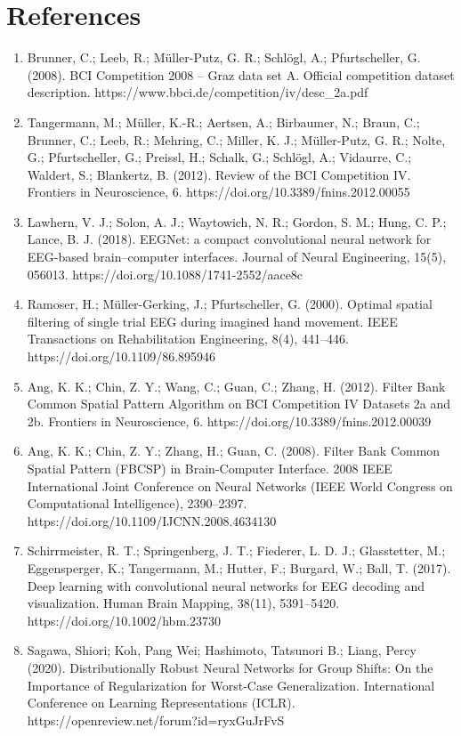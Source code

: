 \documentclass[11pt]{article}
\begin{document}
\section*{References}
\begin{enumerate}
\item Brunner, C.; Leeb, R.; Müller-Putz, G. R.; Schlögl, A.; Pfurtscheller, G. (2008). BCI Competition 2008 -- Graz data set A. Official competition dataset description. https://www.bbci.de/competition/iv/desc\_2a.pdf
\item Tangermann, M.; Müller, K.-R.; Aertsen, A.; Birbaumer, N.; Braun, C.; Brunner, C.; Leeb, R.; Mehring, C.; Miller, K. J.; Müller-Putz, G. R.; Nolte, G.; Pfurtscheller, G.; Preissl, H.; Schalk, G.; Schlögl, A.; Vidaurre, C.; Waldert, S.; Blankertz, B. (2012). Review of the BCI Competition IV. Frontiers in Neuroscience, 6. https://doi.org/10.3389/fnins.2012.00055
\item Lawhern, V. J.; Solon, A. J.; Waytowich, N. R.; Gordon, S. M.; Hung, C. P.; Lance, B. J. (2018). EEGNet: a compact convolutional neural network for EEG-based brain--computer interfaces. Journal of Neural Engineering, 15(5), 056013. https://doi.org/10.1088/1741-2552/aace8c
\item Ramoser, H.; Müller-Gerking, J.; Pfurtscheller, G. (2000). Optimal spatial filtering of single trial EEG during imagined hand movement. IEEE Transactions on Rehabilitation Engineering, 8(4), 441--446. https://doi.org/10.1109/86.895946
\item Ang, K. K.; Chin, Z. Y.; Wang, C.; Guan, C.; Zhang, H. (2012). Filter Bank Common Spatial Pattern Algorithm on BCI Competition IV Datasets 2a and 2b. Frontiers in Neuroscience, 6. https://doi.org/10.3389/fnins.2012.00039
\item Ang, K. K.; Chin, Z. Y.; Zhang, H.; Guan, C. (2008). Filter Bank Common Spatial Pattern (FBCSP) in Brain-Computer Interface. 2008 IEEE International Joint Conference on Neural Networks (IEEE World Congress on Computational Intelligence), 2390--2397. https://doi.org/10.1109/IJCNN.2008.4634130
\item Schirrmeister, R. T.; Springenberg, J. T.; Fiederer, L. D. J.; Glasstetter, M.; Eggensperger, K.; Tangermann, M.; Hutter, F.; Burgard, W.; Ball, T. (2017). Deep learning with convolutional neural networks for EEG decoding and visualization. Human Brain Mapping, 38(11), 5391--5420. https://doi.org/10.1002/hbm.23730
\item Sagawa, Shiori; Koh, Pang Wei; Hashimoto, Tatsunori B.; Liang, Percy (2020). Distributionally Robust Neural Networks for Group Shifts: On the Importance of Regularization for Worst-Case Generalization. International Conference on Learning Representations (ICLR). https://openreview.net/forum?id=ryxGuJrFvS

\end{enumerate}
\end{document}

